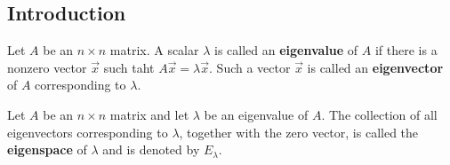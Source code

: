 \documentclass{article}
\begin{document}
\subsection{Introduction}
\begin{definition}
	Let $A$ be an $n\times n$ matrix. A scalar $\lambda$ is called an \textbf{eigenvalue} of $A$ if there is a nonzero vector $\vec x$ such taht $A\vec x=\lambda\vec x$. Such a vector $\vec x$ is called an \textbf{eigenvector} of $A$ corresponding to $\lambda$.
\end{definition}
\begin{definition}
	Let $A$ be an $n\times n$ matrix and let $\lambda$ be an eigenvalue of $A$. The collection of all eigenvectors corresponding to $\lambda$, together with the zero vector, is called the \textbf{eigenspace} of $\lambda$ and is denoted by $E_\lambda$.
\end{definition}
\end{document}
